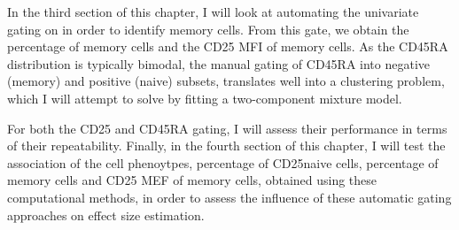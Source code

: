 In the third section of this chapter, I will look at automating the univariate gating on 
in order to identify memory cells.
From this gate, we obtain the percentage of memory cells and the CD25 MFI of memory cells.  
As the CD45RA distribution is typically bimodal, the manual gating of CD45RA into negative (memory) and positive (naive) subsets,
translates well into a clustering problem, which I will attempt to solve by fitting a two-component mixture model.


For both the CD25 and CD45RA gating, I will assess their performance in terms of their repeatability.
Finally, in the fourth section of this chapter, I will test the association of the cell phenoytpes, percentage of CD25\positive naive cells, percentage of memory cells and CD25 MEF of memory cells, obtained using these computational methods, in order to assess the influence of these automatic gating approaches on effect size estimation.







